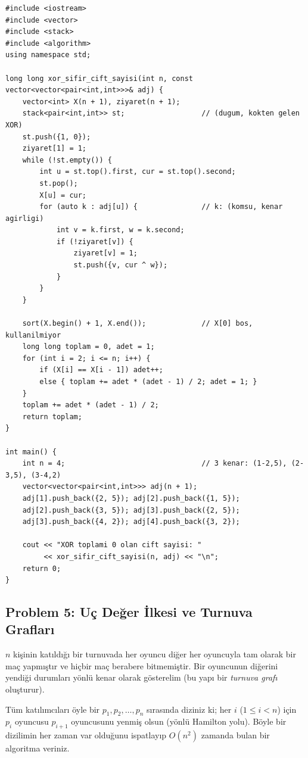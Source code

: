 \begin{lstlisting}[language=CppTemel]
#include <iostream>
#include <vector>
#include <stack>
#include <algorithm>
using namespace std;

long long xor_sifir_cift_sayisi(int n, const vector<vector<pair<int,int>>>& adj) {
    vector<int> X(n + 1), ziyaret(n + 1);
    stack<pair<int,int>> st;                  // (dugum, kokten gelen XOR)
    st.push({1, 0});
    ziyaret[1] = 1;
    while (!st.empty()) {
        int u = st.top().first, cur = st.top().second;
        st.pop();
        X[u] = cur;
        for (auto k : adj[u]) {               // k: (komsu, kenar agirligi)
            int v = k.first, w = k.second;
            if (!ziyaret[v]) {
                ziyaret[v] = 1;
                st.push({v, cur ^ w});
            }
        }
    }

    sort(X.begin() + 1, X.end());             // X[0] bos, kullanilmiyor
    long long toplam = 0, adet = 1;
    for (int i = 2; i <= n; i++) {
        if (X[i] == X[i - 1]) adet++;
        else { toplam += adet * (adet - 1) / 2; adet = 1; }
    }
    toplam += adet * (adet - 1) / 2;
    return toplam;
}

int main() {
    int n = 4;                                // 3 kenar: (1-2,5), (2-3,5), (3-4,2)
    vector<vector<pair<int,int>>> adj(n + 1);
    adj[1].push_back({2, 5}); adj[2].push_back({1, 5});
    adj[2].push_back({3, 5}); adj[3].push_back({2, 5});
    adj[3].push_back({4, 2}); adj[4].push_back({3, 2});

    cout << "XOR toplami 0 olan cift sayisi: "
         << xor_sifir_cift_sayisi(n, adj) << "\n";
    return 0;
}\end{lstlisting}

\subsection{Problem 5: Uç Değer İlkesi ve Turnuva Grafları}

\begin{example}
$n$ kişinin katıldığı bir turnuvada her oyuncu diğer her oyuncuyla tam olarak bir maç yapmıştır ve hiçbir maç berabere bitmemiştir.
Bir oyuncunun diğerini yendiği durumları yönlü kenar olarak gösterelim (bu yapı bir \emph{turnuva grafı} oluşturur).

Tüm katılımcıları öyle bir $p_1, p_2, \dots, p_n$ sırasında diziniz ki; her $i$ ($1 \le i < n$) için $p_i$ oyuncusu $p_{i+1}$ oyuncusunu yenmiş olsun (yönlü Hamilton yolu). Böyle bir dizilimin her zaman var olduğunu ispatlayıp $O(n^2)$ zamanda bulan bir algoritma veriniz.
\end{example}

